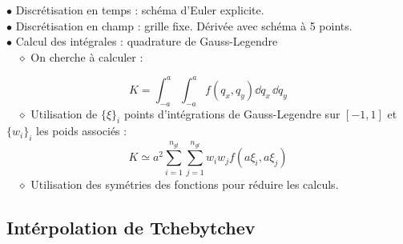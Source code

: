 \documentclass[9pt]{beamer}
\begin{document}
	\sommaire{}
	
	\begin{frame}
	\justifying
	\vspace*{22pt}

	$\bullet$ Discrétisation en temps : schéma d'Euler explicite.\\
	$\bullet$ Discrétisation en champ : grille fixe. Dérivée avec schéma à 5 points. \\
	\vspace*{11pt}
	$\bullet$ Calcul des intégrales : quadrature de Gauss-Legendre \\
	$\quad \diamond$ On cherche à calculer : 
	
	\begin{equation*}
		K = \int_{-a}^{a} \int_{-a}^{a} f(q_x, q_y) \dd q_x \, \dd q_y 
	\end{equation*}
	$\quad \diamond$ Utilisation de $\{\xi\}_i$ points d'intégrations de Gauss-Legendre sur $[-1,1]$ et $\{w_i\}_i$ les poids associés :
	\begin{equation*}
		K \simeq a^2 \sum_{i=1}^{n_{gl}} \sum_{j=1}^{n_{gl}} w_i w_j f(a\xi_i, a\xi_j) 
	\end{equation*}
	$\quad \diamond$ Utilisation des symétries des fonctions pour réduire les calculs.
	
	\vspace*{11pt}
	
	
	
	\end{frame}
	
	\subsection{Intérpolation de Tchebytchev}
	
\end{document}
